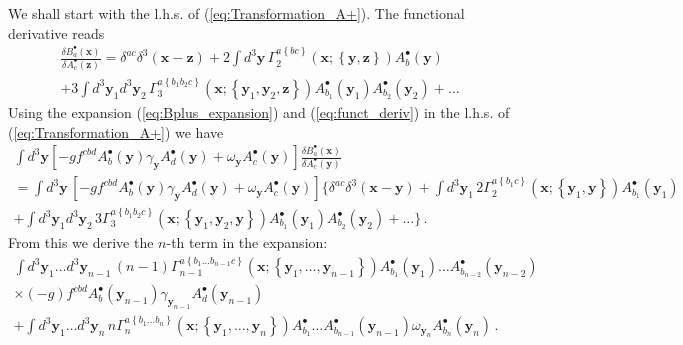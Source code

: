 \documentclass[english,american]{article}
\begin{document}
We shall start with the l.h.s. of (\ref{eq:Transformation_A+}). The
functional derivative reads
\begin{multline}
\frac{\delta B_{a}^{\bullet}\left(\mathbf{x}\right)}{\delta A_{c}^{\bullet}\left(\mathbf{z}\right)}=\delta^{ac}\delta^{3}\left(\mathbf{x}-\mathbf{z}\right)+2\int d^{3}\mathbf{y}\,\Gamma_{2}^{a\left\{ bc\right\} }\left(\mathbf{x};\left\{ \mathbf{y},\mathbf{z}\right\} \right)A_{b}^{\bullet}\left(\mathbf{y}\right)\\
+3\int d^{3}\mathbf{y}_{1}d^{3}\mathbf{y}_{2}\,\Gamma_{3}^{a\left\{ b_{1}b_{2}c\right\} }\left(\mathbf{x};\left\{ \mathbf{y}_{1},\mathbf{y}_{2},\mathbf{z}\right\} \right)A_{b_{1}}^{\bullet}\left(\mathbf{y}_{1}\right)A_{b_{2}}^{\bullet}\left(\mathbf{y}_{2}\right)+\dots\label{eq:funct_deriv}
\end{multline}
Using the expansion (\ref{eq:Bplus_expansion}) and (\ref{eq:funct_deriv})
in the l.h.s. of (\ref{eq:Transformation_A+}) we have
\begin{multline}
\int d^{3}\mathbf{y}\left[-gf^{cbd}A_{b}^{\bullet}\left(\mathbf{y}\right)\gamma_{\mathbf{y}}A_{d}^{\bullet}\left(\mathbf{y}\right)+\omega_{\mathbf{y}}A_{c}^{\bullet}\left(\mathbf{y}\right)\right]\frac{\delta B_{a}^{\bullet}\left(\mathbf{x}\right)}{\delta A_{c}^{\bullet}\left(\mathbf{y}\right)}\\
=\int d^{3}\mathbf{y}\,\left[-gf^{cbd}A_{b}^{\bullet}\left(\mathbf{y}\right)\gamma_{\mathbf{y}}A_{d}^{\bullet}\left(\mathbf{y}\right)+\omega_{\mathbf{y}}A_{c}^{\bullet}\left(\mathbf{y}\right)\right]\Big\{\delta^{ac}\delta^{3}\left(\mathbf{x}-\mathbf{y}\right)+\int d^{3}\mathbf{y}_{1}\,2\Gamma_{2}^{a\left\{ b_{1}c\right\} }\left(\mathbf{x};\left\{ \mathbf{y}_{1},\mathbf{y}\right\} \right)A_{b_{1}}^{\bullet}\left(\mathbf{y}_{1}\right)\\
+\int d^{3}\mathbf{y}_{1}d^{3}\mathbf{y}_{2}\,3\Gamma_{3}^{a\left\{ b_{1}b_{2}c\right\} }\left(\mathbf{x};\left\{ \mathbf{y}_{1},\mathbf{y}_{2},\mathbf{y}\right\} \right)A_{b_{1}}^{\bullet}\left(\mathbf{y}_{1}\right)A_{b_{2}}^{\bullet}\left(\mathbf{y}_{2}\right)+\dots\Big\}\,.
\end{multline}
From this we derive the $n$-th term in the expansion:
\begin{multline}
\int d^{3}\mathbf{y}_{1}\dots d^{3}\mathbf{y}_{n-1}\,\left(n-1\right)\Gamma_{n-1}^{a\left\{ b_{1}\dots b_{n-1}c\right\} }\left(\mathbf{x};\left\{ \mathbf{y}_{1},\dots,\mathbf{y}_{n-1}\right\} \right)A_{b_{1}}^{\bullet}\left(\mathbf{y}_{1}\right)\dots A_{b_{n-2}}^{\bullet}\left(\mathbf{y}_{n-2}\right)\\
\times\left(-g\right)f^{cbd}A_{b}^{\bullet}\left(\mathbf{y}_{n-1}\right)\gamma_{\mathbf{y}_{n-1}}A_{d}^{\bullet}\left(\mathbf{y}_{n-1}\right)\\
+\int d^{3}\mathbf{y}_{1}\dots d^{3}\mathbf{y}_{n}\, n\Gamma_{n}^{a\left\{ b_{1}\dots b_{n}\right\} }\left(\mathbf{x};\left\{ \mathbf{y}_{1},\dots,\mathbf{y}_{n}\right\} \right)A_{b_{1}}^{\bullet}\dots A_{b_{n-1}}^{\bullet}\left(\mathbf{y}_{n-1}\right)\omega_{\mathbf{y}_{n}}A_{b_{n}}^{\bullet}\left(\mathbf{y}_{n}\right)\,.
\end{multline}
\end{document}
